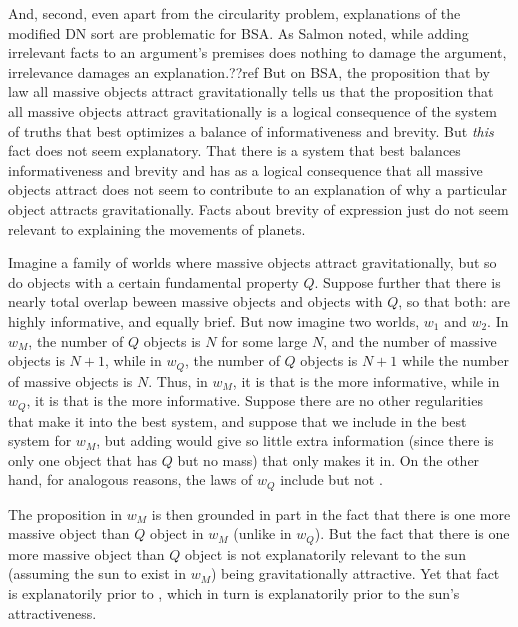 And, second, even apart from the circularity problem, explanations of the modified DN sort are problematic for BSA.
As Salmon noted, while adding irrelevant facts to an argument's premises does nothing to damage the argument, irrelevance
damages an explanation.??ref But on BSA, the proposition that by law all massive objects attract gravitationally tells us
that the proposition that all massive objects attract gravitationally is a logical consequence of the system
of truths that best optimizes a balance of informativeness and brevity. But \textit{this} fact does not seem explanatory.
That there is a system that best balances informativeness and brevity and has as a logical consequence that all massive
objects attract does not seem to contribute to an explanation of why a particular object attracts gravitationally. Facts 
about brevity of expression just do not seem relevant to explaining the movements of planets. 

Imagine a family of worlds where massive objects attract gravitationally, but so do objects with a certain fundamental property $Q$. 
Suppose further that there is nearly total overlap beween massive objects and objects with $Q$, so that both:
are highly informative, and equally brief. But now imagine two worlds, $w_1$ and $w_2$. In $w_M$, the number of $Q$
objects is $N$ for some large $N$, and the number of massive objects is $N+1$, while in $w_Q$, the number of $Q$ objects
is $N+1$ while the number of massive objects is $N$. Thus, in $w_M$, it is  that is the more informative,
while in $w_Q$, it is  that is the more informative. Suppose there are no other regularities that make it
into the best system, and suppose that we include  in the best system for $w_M$, but adding 
would give so little extra information (since there is only one object that has $Q$ but no mass) that only  makes 
it in. On the other hand, for analogous reasons, the laws of $w_Q$ include  but not . 

The proposition  in $w_M$ is then grounded in part in the fact that there is one more massive object
than $Q$ object in $w_M$ (unlike in $w_Q$). But the fact that there is one more massive object than $Q$ object is 
not explanatorily relevant to the sun (assuming the sun to exist in $w_M$) being gravitationally attractive. 
Yet that fact is explanatorily prior to , which in turn is explanatorily prior to the sun's attractiveness.

